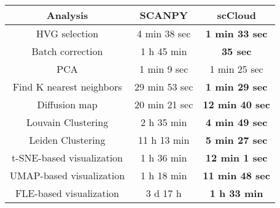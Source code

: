 \documentclass[10pt]{article}
\begin{document}
\begin{table}[H]
	\centering
	\begin{tabular}{|c|c|c|}
		\hline
		Analysis  & SCANPY & scCloud\\
		\hline \hline
		HVG selection  & 4 min 38 sec  & \textbf{1 min 33 sec}  \\
		\hline
		Batch correction  & 1 h 45 min  & \textbf{35 sec}  \\
		\hline
		PCA   & 1 min 9 sec  & 1 min 25 sec  \\
		\hline
		Find K nearest neighbors  & 29 min 53 sec  & \textbf{1 min 29 sec}  \\
		\hline
		Diffusion map   & 20 min 21 sec  & \textbf{12 min 40 sec}  \\
		\hline
		Louvain Clustering  & 2 h 35 min  & \textbf{4 min 49 sec}  \\
		\hline 
		Leiden Clustering & 11 h 13 min  & \textbf{5 min 27 sec}  \\
		\hline
		t-SNE-based visualization  & 1 h 36 min  & \textbf{12 min 1 sec}  \\
		\hline
		UMAP-based visualization  & 1 h 18 min   & \textbf{11 min 48 sec}  \\
		\hline
		FLE-based visualization   & 3 d 17 h  & \textbf{1 h 33 min}  \\
		\hline
	\end{tabular}
\end{table}
\end{document}
